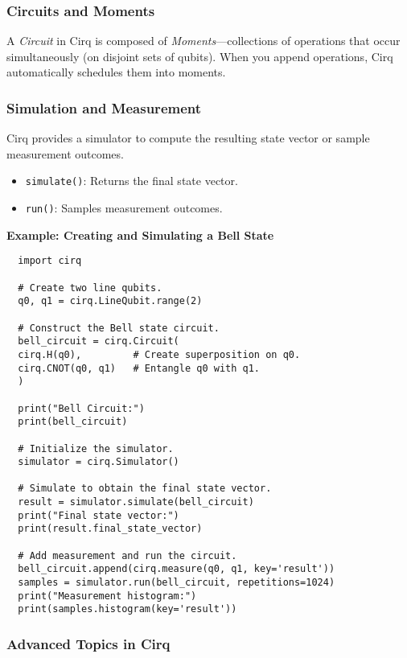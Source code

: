 \subsubsection*{Circuits and Moments}
A \emph{Circuit} in Cirq is composed of \emph{Moments}—collections of
operations that occur simultaneously (on disjoint sets of qubits). When you
append operations, Cirq automatically schedules them into moments.

\subsubsection*{Simulation and Measurement}

Cirq provides a simulator to compute the resulting state vector or sample
measurement outcomes.

\begin{itemize}
  \item \texttt{simulate()}: Returns the final state vector.

  \item \texttt{run()}: Samples measurement outcomes.
\end{itemize}

\textbf{Example: Creating and Simulating a Bell State}
\begin{verbatim}
  import cirq

  # Create two line qubits.
  q0, q1 = cirq.LineQubit.range(2)

  # Construct the Bell state circuit.
  bell_circuit = cirq.Circuit(
  cirq.H(q0),         # Create superposition on q0.
  cirq.CNOT(q0, q1)   # Entangle q0 with q1.
  )

  print("Bell Circuit:")
  print(bell_circuit)

  # Initialize the simulator.
  simulator = cirq.Simulator()

  # Simulate to obtain the final state vector.
  result = simulator.simulate(bell_circuit)
  print("Final state vector:")
  print(result.final_state_vector)

  # Add measurement and run the circuit.
  bell_circuit.append(cirq.measure(q0, q1, key='result'))
  samples = simulator.run(bell_circuit, repetitions=1024)
  print("Measurement histogram:")
  print(samples.histogram(key='result'))
\end{verbatim}

\subsubsection*{Advanced Topics in Cirq}

